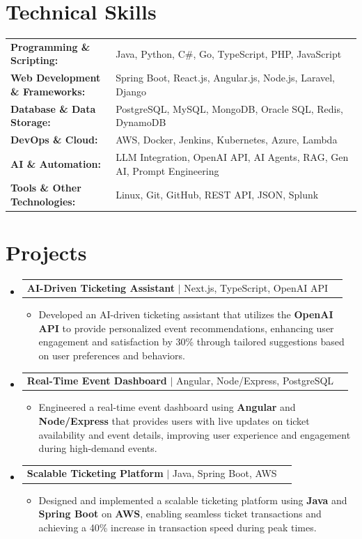 \documentclass[letterpaper,10pt]{article}
\makeatletter
\newcommand{\resumeItem}[1]{
  \item{\fontsize{8pt}{9pt}\selectfont
    #1 \vspace{-3pt}
  }
}
\newcommand{\resumeProjectHeading}[2]{
    \item
    \begin{tabular*}{1.001\textwidth}{l@{\extracolsep{\fill}}r}
      \fontsize{8.5pt}{10pt}#1 & \textbf{\fontsize{8.5pt}{10pt} #2}\\
    \end{tabular*}\vspace{-7pt}
}
\newcommand{\resumeSubHeadingListStart}{\begin{itemize}[leftmargin=0pt, label={}]}
\newcommand{\resumeSubHeadingListEnd}{\end{itemize}}
\newcommand{\resumeItemListStart}{\begin{itemize}[leftmargin=*]}
\newcommand{\resumeItemListEnd}{\end{itemize}\vspace{-5pt}}
\makeatother
\begin{document}
\section{Technical Skills}
        \vspace{-14pt}
        \begin{table}[h]
            \fontsize{8pt}{9pt}\selectfont
            \begin{tabular}{p{0.3\linewidth} p{0.7\linewidth}}
                \textbf{Programming \& Scripting:} & Java, Python, C\#, Go, TypeScript, PHP, JavaScript \\
                \textbf{Web Development \& Frameworks:} & Spring Boot, React.js, Angular.js, Node.js, Laravel, Django \\
                \textbf{Database \& Data Storage:} & PostgreSQL, MySQL, MongoDB, Oracle SQL, Redis, DynamoDB \\
                \textbf{DevOps \& Cloud:} & AWS, Docker, Jenkins, Kubernetes, Azure, Lambda \\
                \textbf{AI \& Automation:} & LLM Integration, OpenAI API, AI Agents, RAG, Gen AI, Prompt Engineering \\
                \textbf{Tools \& Other Technologies:} & Linux, Git, GitHub, REST API, JSON, Splunk \\
            \end{tabular}
        \end{table}
 \vspace{-18pt}

\section{Projects}
    \vspace{-5pt}
    \resumeSubHeadingListStart
          \resumeProjectHeading
            {\textbf{AI-Driven Ticketing Assistant} $|$ Next.js, TypeScript, OpenAI API}{}
            \resumeItemListStart
                \resumeItem{Developed an AI-driven ticketing assistant that utilizes the \textbf{OpenAI API} to provide personalized event recommendations, enhancing user engagement and satisfaction by 30\% through tailored suggestions based on user preferences and behaviors.}
            \resumeItemListEnd
        \vspace{-12pt}
    
        \resumeProjectHeading
            {\textbf{Real-Time Event Dashboard} $|$ Angular, Node/Express, PostgreSQL}{}
        \resumeItemListStart
                \resumeItem{Engineered a real-time event dashboard using \textbf{Angular} and \textbf{Node/Express} that provides users with live updates on ticket availability and event details, improving user experience and engagement during high-demand events.}
        \resumeItemListEnd
      \vspace{-12pt}
      \resumeProjectHeading
        {\textbf{Scalable Ticketing Platform} $|$ Java, Spring Boot, AWS}{}
    \resumeItemListStart
            \resumeItem{Designed and implemented a scalable ticketing platform using \textbf{Java} and \textbf{Spring Boot} on \textbf{AWS}, enabling seamless ticket transactions and achieving a 40\% increase in transaction speed during peak times.}
    \resumeItemListEnd
    \resumeSubHeadingListEnd
\end{document}

